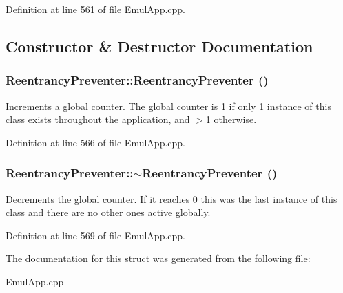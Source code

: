 Definition at line 561 of file EmulApp.cpp.

\subsection{Constructor \& Destructor Documentation}
\subsubsection{\setlength{\rightskip}{0pt plus 5cm}ReentrancyPreventer::ReentrancyPreventer ()\hspace{0.3cm}{\tt  [inline]}}\label{structReentrancyPreventer_7f5d7b40387ab9edf6575602b2121310}


Increments a global counter. The global counter is 1 if only 1 instance of this class exists throughout the application, and $>$1 otherwise. 

Definition at line 566 of file EmulApp.cpp.
\subsubsection{\setlength{\rightskip}{0pt plus 5cm}ReentrancyPreventer::$\sim$ReentrancyPreventer ()\hspace{0.3cm}{\tt  [inline]}}\label{structReentrancyPreventer_83ee912ed2df8e2d8ff6d8bd656b79a9}


Decrements the global counter. If it reaches 0 this was the last instance of this class and there are no other ones active globally. 

Definition at line 569 of file EmulApp.cpp.

The documentation for this struct was generated from the following file:\begin{CompactItemize}
\item 
EmulApp.cpp\end{CompactItemize}
